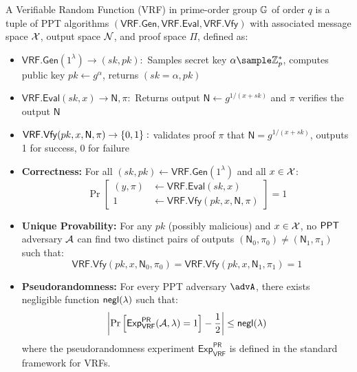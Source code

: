 \begin{definition}
A Verifiable Random Function (VRF) in prime-order group $\mathbb{G}$ of order $q$ is a tuple of PPT algorithms $(\mathsf{VRF.Gen}, \mathsf{VRF.Eval}, \mathsf{VRF.Vfy})$ with associated message space $\mathcal{X}$, output space $\mathcal{N}$, and proof space $\Pi$, defined as:

\begin{itemize}
    \item $\mathsf{VRF.Gen}(1^\lambda) \to (sk, pk):$ Samples secret key $\alpha \sample \Zp^*$, computes public key $pk \gets g^\alpha$, returns $(sk = \alpha, pk)$
    
    \item $\mathsf{VRF.Eval}(sk, x) \to \textsf{N}, \pi:$ Returns output $\textsf{N} \gets g^{1/(x+sk)}$ and $\pi$ verifies the output $\textsf{N}$
    
    \item $\mathsf{VRF.Vfy}(pk, x, \textsf{N}, \pi) \to \{0,1\}:$ validates proof $\pi$ that $\textsf{N} = g^{1/(x+sk)}$, outputs 1 for success, 0 for failure
\end{itemize}
\end{definition}

\begin{itemize}
    \item \textbf{Correctness:} For all $(sk, pk) \gets \mathsf{VRF.Gen}(1^\lambda)$ and all $x \in \mathcal{X}$:
    \[
    \Pr\left[\begin{aligned}
        (y, \pi) &\gets \mathsf{VRF.Eval}(sk, x) \\
        1 &\gets \mathsf{VRF.Vfy}(pk, x, \textsf{N}, \pi)
    \end{aligned}\right] = 1
    \]

    \item \textbf{Unique Provability:} For any $pk$ (possibly malicious) and $x \in \mathcal{X}$, no $\mathsf{PPT}$ adversary $\mathcal{A}$ can find two distinct pairs of outputs $(\textsf{N}_0, \pi_0) \neq (\textsf{N}_1, \pi_1)$ such that:
    \[
    \mathsf{VRF.Vfy}(pk, x, \textsf{N}_0, \pi_0) = \mathsf{VRF.Vfy}(pk, x, \textsf{N}_1, \pi_1) = 1
    \]

    \item \textbf{Pseudorandomness:} For every PPT adversary $\advA$, there exists negligible function ${\mathsf{negl}(\lambda)}$ such that:
    \[
    \left|\Pr\left[\mathsf{Exp}_{\mathsf{VRF}}^{\mathsf{PR}}(\mathcal{A}, \lambda) = 1\right] - \frac{1}{2}\right| \leq {\mathsf{negl}(\lambda)}
    \]
    where the pseudorandomness experiment $\mathsf{Exp}_{\mathsf{VRF}}^{\mathsf{PR}}$ is defined in the standard framework for VRFs.
\end{itemize}


